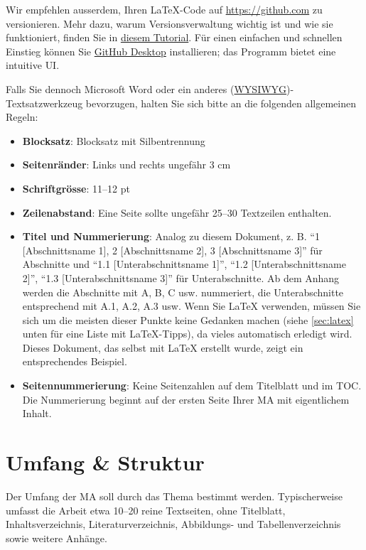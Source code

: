 Wir empfehlen ausserdem, Ihren \LaTeX{}-Code auf \url{https://github.com} zu versionieren. Mehr dazu, warum Versionsverwaltung wichtig ist und wie sie funktioniert, finden Sie in \href{https://docs.github.com/en/get-started/start-your-journey/about-github-and-git}{diesem Tutorial}. Für einen einfachen und schnellen Einstieg können Sie \href{https://desktop.github.com/download/}{GitHub Desktop} installieren; das Programm bietet eine intuitive \gls{UI}.

Falls Sie dennoch Microsoft Word oder ein anderes (\href{https://de.wikipedia.org/wiki/WYSIWYG}{WYSIWYG})-Textsatzwerkzeug bevorzugen, halten Sie sich bitte an die folgenden allgemeinen Regeln:

\begin{itemize}
	\item \textbf{Blocksatz}: Blocksatz mit Silbentrennung
	\item \textbf{Seitenränder}: Links und rechts ungefähr 3 cm
	\item \textbf{Schriftgrösse}: 11--12 pt
	\item \textbf{Zeilenabstand}: Eine Seite sollte ungefähr 25--30 Textzeilen enthalten.
	\item \textbf{Titel und Nummerierung}: Analog zu diesem Dokument, z. B. \enquote{1 [Abschnittsname 1], 2 [Abschnittsname 2], 3 [Abschnittsname 3]} für Abschnitte und \enquote{1.1 [Unterabschnittsname 1]}, \enquote{1.2 [Unterabschnittsname 2]}, \enquote{1.3 [Unterabschnittsname 3]} für Unterabschnitte. Ab dem Anhang werden die Abschnitte mit A, B, C usw. nummeriert, die Unterabschnitte entsprechend mit A.1, A.2, A.3 usw. Wenn Sie \LaTeX{} verwenden, müssen Sie sich um die meisten dieser Punkte keine Gedanken machen (siehe \cref{sec:latex} unten für eine Liste mit \LaTeX{}-Tipps), da vieles automatisch erledigt wird. Dieses Dokument, das selbst mit \LaTeX{} erstellt wurde, zeigt ein entsprechendes Beispiel.
	\item \textbf{Seitennummerierung}: Keine Seitenzahlen auf dem Titelblatt und im \gls{TOC}. Die Nummerierung beginnt auf der ersten Seite Ihrer \gls{MA} mit eigentlichem Inhalt.
\end{itemize}


\section{Umfang \& Struktur}

Der Umfang der MA soll durch das Thema bestimmt werden. Typischerweise umfasst die Arbeit etwa 10--20 reine Textseiten, ohne Titelblatt, Inhaltsverzeichnis, Literaturverzeichnis, Abbildungs- und Tabellenverzeichnis sowie weitere Anhänge.


